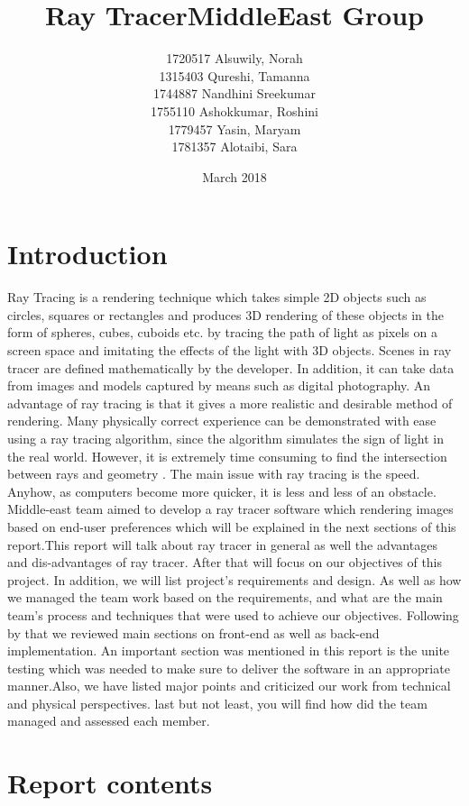\documentclass{article}
\title{Ray Tracer}
\title{MiddleEast Group}
\author{1720517 	Alsuwily, Norah \\ 1315403 	Qureshi, Tamanna \\
1744887 	Nandhini Sreekumar \\
1755110 	Ashokkumar, Roshini \\
1779457 	Yasin, Maryam \\
1781357 	Alotaibi, Sara }
\date{March 2018}
\begin{document}
\maketitle 

\section{Introduction}

Ray Tracing is a rendering technique which takes simple 2D objects such as circles, squares or rectangles and
produces 3D rendering of these objects in the form of spheres, cubes, cuboids etc.  by tracing the path of light as pixels on a screen space and imitating the effects of the light  with 3D objects. Scenes in ray tracer are defined mathematically by the developer. In addition, it can take data from images and models captured by means such as digital photography. \newline An advantage of ray tracing is that it gives a more realistic and desirable method of rendering. Many physically correct experience can be demonstrated with ease using a ray tracing algorithm, since the algorithm simulates the sign of light in the real world.
However, it is extremely time consuming to find the intersection between rays and geometry \cite{1}. The main issue with ray tracing is the speed. Anyhow, as computers become more quicker, it is less and less of an obstacle. Middle-east team aimed to develop a ray tracer software which rendering images based on end-user preferences which will be explained in the next sections of this report.This report will talk about ray tracer in general as well the advantages and dis-advantages of ray tracer. After that will focus on our objectives of this project. In addition, we will list project's requirements and design. As well as how we managed the team work based on the requirements, and what are the main team's process and techniques that were used to achieve our objectives.  Following by that we reviewed main sections on front-end as well as back-end implementation. An important section was mentioned in this report is the unite testing which was needed to make sure to deliver the software in an appropriate manner.Also, we have listed major points and criticized our work from technical and physical perspectives. last but not least, you will find how did the team managed and assessed each member. 

\section{Report contents}
\end{document}
